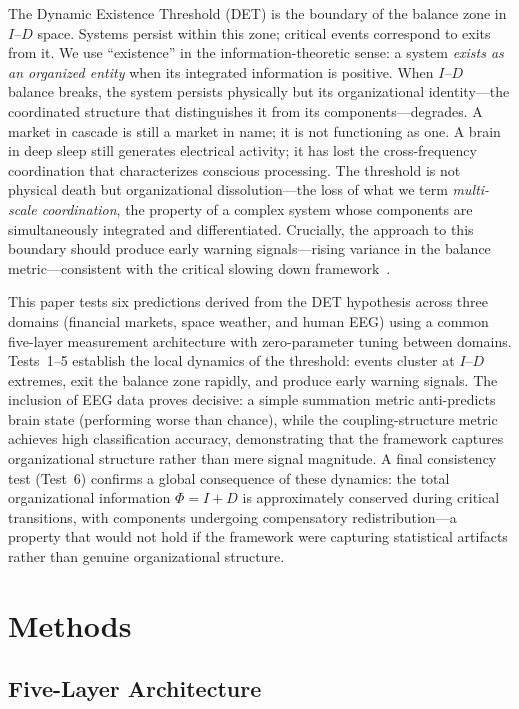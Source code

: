 \documentclass[aip,cha,reprint,amsmath,amssymb,final,floatfix]{revtex4-2}
\begin{document}
The Dynamic Existence Threshold (DET) is the boundary of the balance zone in $I$--$D$ space. Systems persist within this zone; critical events correspond to exits from it. We use ``existence'' in the information-theoretic sense: a system \emph{exists as an organized entity} when its integrated information is positive. When $I$--$D$ balance breaks, the system persists physically but its organizational identity---the coordinated structure that distinguishes it from its components---degrades. A market in cascade is still a market in name; it is not functioning as one. A brain in deep sleep still generates electrical activity; it has lost the cross-frequency coordination that characterizes conscious processing. The threshold is not physical death but organizational dissolution---the loss of what we term \emph{multi-scale coordination}, the property of a complex system whose components are simultaneously integrated and differentiated. Crucially, the approach to this boundary should produce early warning signals---rising variance in the balance metric---consistent with the critical slowing down framework~\cite{scheffer2009}.

This paper tests six predictions derived from the DET hypothesis across three domains (financial markets, space weather, and human EEG) using a common five-layer measurement architecture with zero-parameter tuning between domains. Tests~1--5 establish the local dynamics of the threshold: events cluster at $I$--$D$ extremes, exit the balance zone rapidly, and produce early warning signals. The inclusion of EEG data proves decisive: a simple summation metric anti-predicts brain state (performing worse than chance), while the coupling-structure metric achieves high classification accuracy, demonstrating that the framework captures organizational structure rather than mere signal magnitude. A final consistency test (Test~6) confirms a global consequence of these dynamics: the total organizational information $\Phi = I + D$ is approximately conserved during critical transitions, with components undergoing compensatory redistribution---a property that would not hold if the framework were capturing statistical artifacts rather than genuine organizational structure.


\section{Methods}

\subsection{Five-Layer Architecture}
\end{document}
